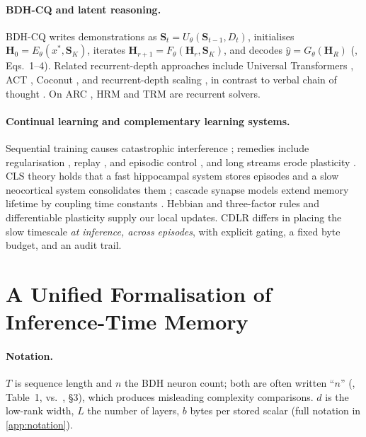 \documentclass[10pt]{article}
\theoremstyle{remark}
\newcommand{\Sm}{\mathbf{S}}
\newcommand{\Hm}{\mathbf{H}}
\newcommand{\cdlr}{\textsc{CDLR}}
\begin{document}
\paragraph{BDH-CQ and latent reasoning.} BDH-CQ writes demonstrations as $\Sm_t=U_\theta(\Sm_{t-1},D_t)$, initialises
$\Hm_0=E_\theta(x^*,\Sm_K)$, iterates $\Hm_{r+1}=F_\theta(\Hm_r,\Sm_K)$, and decodes $\hat y=G_\theta(\Hm_R)$
(\citealp{engdahl2026bdhcq}, Eqs.~1--4). Related recurrent-depth approaches include Universal Transformers
\citep{dehghani2019universal}, ACT \citep{graves2016act}, Coconut \citep{hao2024coconut}, and recurrent-depth scaling
\citep{geiping2025recurrent}, in contrast to verbal chain of thought \citep{wei2022cot}. On ARC
\citep{chollet2019measure}, HRM \citep{wang2025hrm} and TRM \citep{jolicoeur2025trm} are recurrent solvers.

\paragraph{Continual learning and complementary learning systems.} Sequential training causes catastrophic
interference \citep{mccloskey1989catastrophic,french1999catastrophic}; remedies include regularisation
\citep{kirkpatrick2017ewc,zenke2017si}, replay \citep{lopezpaz2017gem,rolnick2019replay}, and episodic control
\citep{pritzel2017nec}, and long streams erode plasticity \citep{dohare2024loss}. CLS theory holds that a fast
hippocampal system stores episodes and a slow neocortical system consolidates them \citep{mcclelland1995cls,kumaran2016cls};
cascade synapse models extend memory lifetime by coupling time constants \citep{fusi2005cascade,benna2016consolidation}.
Hebbian and three-factor rules \citep{hebb1949organization,oja1982simplified,gerstner2018eligibility} and differentiable
plasticity \citep{miconi2018differentiable} supply our local updates. \cdlr{} differs in placing the slow timescale
\emph{at inference, across episodes}, with explicit gating, a fixed byte budget, and an audit trail.

\section{A Unified Formalisation of Inference-Time Memory}
\label{sec:formal}

\paragraph{Notation.} $T$ is sequence length and $n$ the BDH neuron count; both are often written ``$n$''
(\citealp{vaswani2017attention}, Table~1, vs.\ \citealp{kosowski2025bdh}, \S3), which produces misleading
complexity comparisons. $d$ is the low-rank width, $L$ the number of layers, $b$ bytes per stored scalar
(full notation in \cref{app:notation}).
\end{document}
